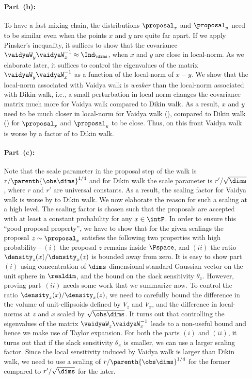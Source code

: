 \paragraph{Part~(b):} %
\label{par:part_b}
To have a fast mixing chain, the distributions $\proposal_x$ and $\proposal_y$ need to be similar even when the points $x$ and $y$ are quite far apart.
If we apply Pinsker's inequality, it suffices to show that the covariance $\vaidyaW_y \vaidyaW_x^{-1} \approx \Ind_\dims$, when $x$ and $y$ are close in local-norm.
As we elaborate later, it suffices to control the eigenvalues of the matrix $\vaidyaW_y \vaidyaW_x^{-1}$ as a function of the local-norm of $x-y$.
We show that the local-norm associated with Vaidya walk is \emph{weaker} than the local-norm associated with Dikin walk, i.e., a small perturbation in local-norm changes the covariance matrix much more for Vaidya walk compared to Dikin walk.
As a result, $x$ and $y$ need to be much closer in local-norm for Vaidya walk (), compared to Dikin walk () for $\proposal_x$ and $\proposal_y$ to be close.
Thus, on this front Vaidya walk is worse by a factor of  to Dikin walk.

\paragraph{Part~(c):} %
\label{par:part_c}
Note that the scale parameter in the proposal step of the walk  is ${r}/{\parenth{\obs\dims}^{1/4}}$ and for Dikin walk the scale parameter is ${r'}/{\sqrt{\dims}}$, where $r$ and $r'$ are universal constants.
As a result, the scaling factor for Vaidya walk is worse by  to Dikin walk.
We now elaborate the reason for such a scaling at a high level.
The scaling factor is chosen such that the proposals are accepted with at least a constant probability for any $x \in \intP$.
In order to ensure this ``good proposal property'', we have to show that for the given scalings the proposal $z \sim \proposal_x$ satisfies the following two properties with high probability---$(i)$ the proposal $z$ remains inside $\Pspace$, and $(ii)$ the ratio $\density_z(x)/\density_x(z)$ is bounded away from zero.
It is easy to show part~$(i)$ using concentration of $\dims$-dimensional standard Gaussian vector on the unit sphere in $\realdim$, and the bound on the slack sensitivity $\theta_x$.
However, proving part~$(ii)$ needs some work that we summarize now.
To control the ratio $\density_z(x)/\density_x(z)$, we need to carefully bound the difference in the volume of unit-ellipsoids defined by $V_z$ and $V_x$, and the difference in local-norms at $z$ and $x$ scaled by $\sqrt{\obs\dims}$.
It turns out that controlling the eigenvalues of the matrix $\vaidyaW_z \vaidyaW_x^{-1}$ leads to a non-useful bound and hence we make use of Taylor expansion.
For both the parts $(i)$ and $(ii)$, it turns out that if the slack sensitivity $\theta_{x}$ is smaller, we can use a larger scaling factor.
Since the local sensitivity induced by Vaidya walk is larger than Dikin walk, we need to use a scaling of ${r/\parenth{\obs\dims}^{1/4}}$ for the former compared to $r'/\sqrt{\dims}$ for the later.


